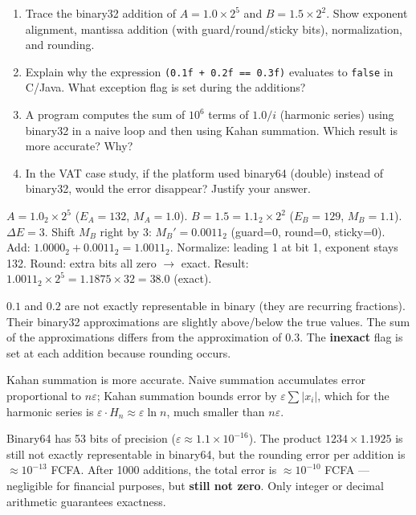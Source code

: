 \documentclass[11pt]{article}
\begin{document}
\begin{exercice}
\begin{enumerate}
\item Trace the binary32 addition of $A = 1.0 \times 2^5$ and $B = 1.5 \times 2^2$. Show exponent alignment, mantissa addition (with guard/round/sticky bits), normalization, and rounding.
\item Explain why the expression \texttt{(0.1f + 0.2f == 0.3f)} evaluates to \texttt{false} in C/Java. What exception flag is set during the additions?
\item A program computes the sum of $10^6$ terms of $1.0 / i$ (harmonic series) using binary32 in a naive loop and then using Kahan summation. Which result is more accurate? Why?
\item In the VAT case study, if the platform used binary64 (double) instead of binary32, would the error disappear? Justify your answer.
\end{enumerate}
\end{exercice}

\begin{corrige}[Exercise 1]
$A = 1.0_2 \times 2^5$ ($E_A=132$, $M_A=1.0$). $B = 1.5 = 1.1_2 \times 2^2$ ($E_B=129$, $M_B=1.1$).
$\Delta E = 3$. Shift $M_B$ right by 3: $M_B' = 0.0011_2$ (guard=0, round=0, sticky=0).
Add: $1.0000_2 + 0.0011_2 = 1.0011_2$.
Normalize: leading 1 at bit 1, exponent stays 132.
Round: extra bits all zero $\to$ exact.
Result: $1.0011_2 \times 2^5 = 1.1875 \times 32 = 38.0$ (exact).
\end{corrige}

\begin{corrige}[Exercise 2]
$0.1$ and $0.2$ are not exactly representable in binary (they are recurring fractions). Their binary32 approximations are slightly above/below the true values. The sum of the approximations differs from the approximation of $0.3$. The \textbf{inexact} flag is set at each addition because rounding occurs.
\end{corrige}

\begin{corrige}[Exercise 3]
Kahan summation is more accurate. Naive summation accumulates error proportional to $n \varepsilon$; Kahan summation bounds error by $\varepsilon \sum |x_i|$, which for the harmonic series is $\varepsilon \cdot H_n \approx \varepsilon \ln n$, much smaller than $n \varepsilon$.
\end{corrige}

\begin{corrige}[Exercise 4]
Binary64 has 53 bits of precision ($\varepsilon \approx 1.1 \times 10^{-16}$). The product $1234 \times 1.1925$ is still not exactly representable in binary64, but the rounding error per addition is $\approx 10^{-13}$ FCFA. After 1000 additions, the total error is $\approx 10^{-10}$ FCFA — negligible for financial purposes, but \textbf{still not zero}. Only integer or decimal arithmetic guarantees exactness.
\end{corrige}
\end{document}
